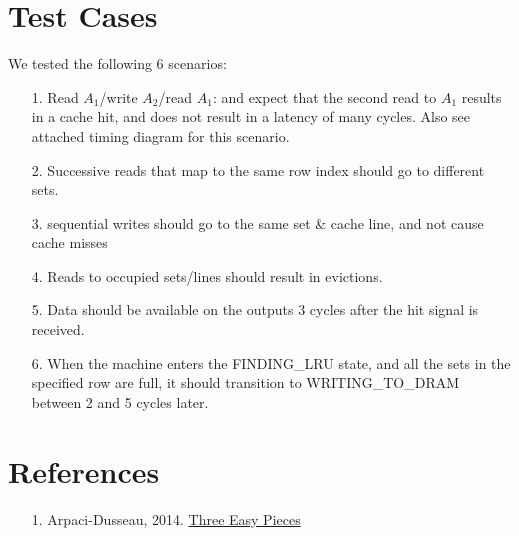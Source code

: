 \documentclass{article}
\begin{document}
\section{Test Cases}
We tested the following 6 scenarios:
\begin{enumerate}
	\item[1.] Read $A_{1}$/write $A_{2}$/read $A_{1}$: and expect that the second read to $A_{1}$ results in a cache hit, and does not result in a latency of many cycles.  Also see attached timing diagram for this scenario.
	\item[2.] Successive reads that map to the same row index should go to different sets.
	\item[3.] sequential writes should go to the same set \& cache line, and not cause cache misses
	\item[4.] Reads to occupied sets/lines should result in evictions.
	\item[5.] Data should be available on the outputs 3 cycles after the hit signal is received.
	\item[6.] When the machine enters the FINDING\_LRU state, and all the sets in the specified row are full, it should transition to WRITING\_TO\_DRAM between 2 and 5 cycles later.
\end{enumerate}
\section{References} 
\begin{enumerate}
	\item[1.] Arpaci-Dusseau, 2014.  \href{http://pages.cs.wisc.edu/~remzi/OSTEP/vm-beyondphys-policy.pdf}{Three Easy Pieces}
\end{enumerate}
\end{document}
